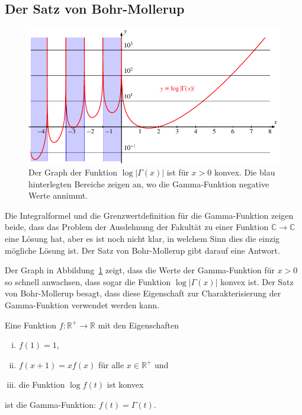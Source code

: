 %
%
%
\subsection{Der Satz von Bohr-Mollerup
\label{buch:rekursion:subsection:bohr-mollerup}}
\begin{figure}
\centering
\includegraphics{chapters/040-rekursion/images/loggammaplot.pdf}
\caption{Der Graph der Funktion $\log|\Gamma(x)|$ ist für $x>0$ konvex. 
Die blau hinterlegten Bereiche zeigen an, wo die Gamma-Funktion
negative Werte annimmt.
\label{buch:rekursion:gamma:loggammaplot}}
\end{figure}
Die Integralformel und die Grenzwertdefinition für die Gamma-Funktion
zeigen beide, dass das Problem der Ausdehnung der Fakultät zu einer
Funktion $\mathbb{C}\to\mathbb{C}$ eine Lösung hat, aber es ist noch
nicht klar, in welchem Sinn dies die einzig mögliche Lösung ist.
Der Satz von Bohr-Mollerup gibt darauf eine Antwort.

Der Graph
in Abbildung~\ref{buch:rekursion:gamma:loggammaplot}
zeigt, dass die Werte der Gamma-Funktion für $x>0$ so schnell
anwachsen, dass sogar die Funktion $\log|\Gamma(x)|$ konvex ist.
Der Satz von Bohr-Mollerup besagt, dass diese Eigenschaft zur
Charakterisierung der Gamma-Funktion verwendet werden kann.

\begin{satz}
\label{buch:satz:bohr-mollerup}
Eine Funktion $f\colon \mathbb{R}^+\to\mathbb{R}$ mit den Eigenschaften
\begin{enumerate}[i)]
\item $f(1)=1$,
\item $f(x+1)=xf(x)$ für alle $x\in\mathbb{R}^+$ und
\item die Funktion $\log f(t)$ ist konvex
\end{enumerate}
ist die Gamma-Funktion: $f(t)=\Gamma(t)$.
%
%
\end{satz}

